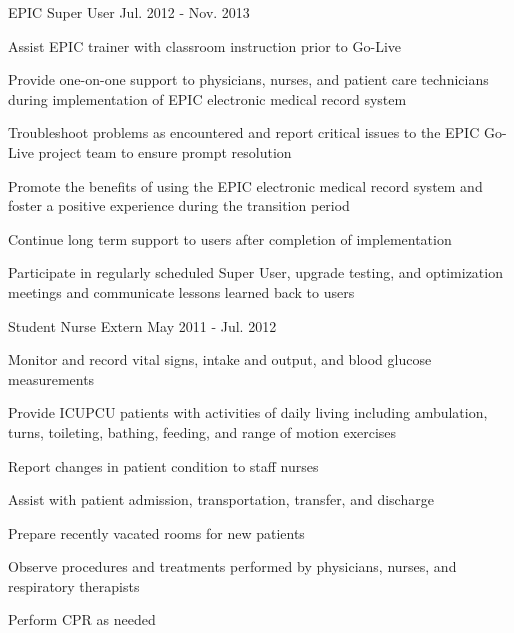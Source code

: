 \begin{cventries}
  \cventry
    {EPIC Super User}
    {}
    {}
    {Jul. 2012 - Nov. 2013}
    {
      \begin{cvitems}
      \item {Assist EPIC trainer with classroom instruction prior to Go-Live}
      \item {Provide one-on-one support to physicians, nurses, and patient care technicians during implementation of EPIC electronic medical record system}
      \item {Troubleshoot problems as encountered and report critical issues to the EPIC Go-Live project team to ensure prompt resolution}
      \item {Promote the benefits of using the EPIC electronic medical record system and foster a positive experience during the transition period}
      \item {Continue long term support to users after completion of implementation}
      \item {Participate in regularly scheduled Super User, upgrade testing, and optimization meetings and communicate lessons learned back to users}
      \end{cvitems}
    }

  \cventry
    {Student Nurse Extern}
    {}
    {}
    {May 2011 - Jul. 2012}
    {
      \begin{cvitems}
      \item {Monitor and record vital signs, intake and output, and blood glucose measurements}
      \item {Provide ICU\/PCU patients with activities of daily living including ambulation, turns, toileting, bathing, feeding, and range of motion exercises}
      \item {Report changes in patient condition to staff nurses}
      \item {Assist with patient admission, transportation, transfer, and discharge}
      \item {Prepare recently vacated rooms for new patients}
      \item {Observe procedures and treatments performed by physicians, nurses, and respiratory therapists}
      \item {Perform CPR as needed}
      \end{cvitems}
    }


\end{cventries}
